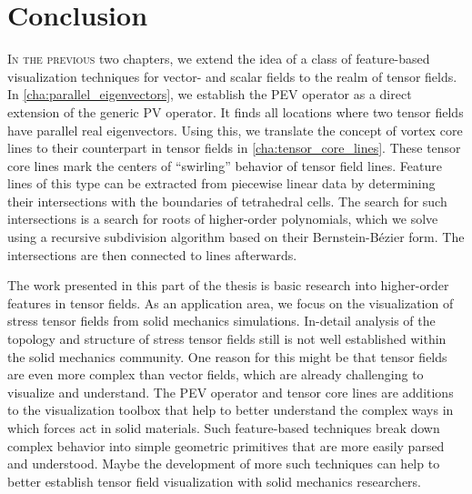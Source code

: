 \chapter{Conclusion} %
\label{cha:tensor_vis_conclusions}
%
\lettrine[lhang=0.06, loversize=-0.015, findent=-1pt, nindent=3pt]{I}{n the previous} two
chapters, we extend the idea of a class of feature-based visualization
techniques for vector- and scalar fields to the realm of tensor fields.
%
In \cref{cha:parallel_eigenvectors}, we establish the \ac{PEV} operator as a
direct extension of the generic \ac{PV} operator.
%
It finds all locations where two tensor fields have parallel real eigenvectors.
%
Using this, we translate the concept of vortex core lines to their counterpart
in tensor fields in \cref{cha:tensor_core_lines}.
%
These tensor core lines mark the centers of ``swirling'' behavior of tensor
field lines.
%
Feature lines of this type can be extracted from piecewise linear data by
determining their intersections with the boundaries of tetrahedral cells.
%
The search for such intersections is a search for roots of higher-order
polynomials, which we solve using a recursive subdivision algorithm based on
their Bernstein-B\'ezier form.
%
The intersections are then connected to lines afterwards.
%

%
The work presented in this part of the thesis is basic research into
higher-order features in tensor fields.
%
As an application area, we focus on the visualization of stress tensor fields
from solid mechanics simulations.
%
In-detail analysis of the topology and structure of stress tensor fields still
is not well established within the solid mechanics community.
%
One reason for this might be that tensor fields are even more complex than
vector fields, which are already challenging to visualize and understand.
%
The \ac{PEV} operator and tensor core lines are additions to the visualization
toolbox that help to better understand the complex ways in which forces act in
solid materials.
%
Such feature-based techniques break down complex behavior into simple geometric
primitives that are more easily parsed and understood.
%
Maybe the development of more such techniques can help to better establish
tensor field visualization with solid mechanics researchers.
%
